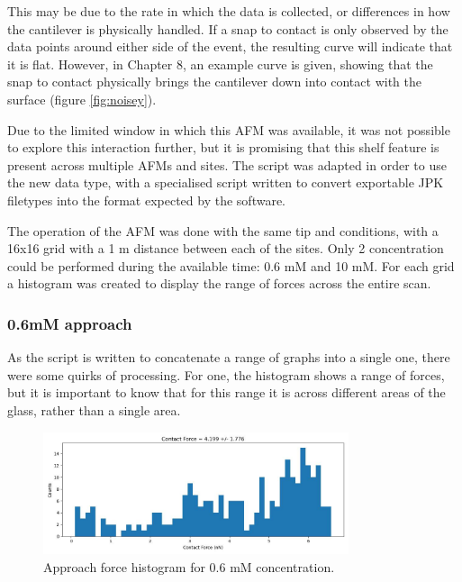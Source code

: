 This may be due to the rate in which the data is collected, or differences in how the cantilever is physically handled. If a snap to contact is only observed by the data points around either side of the event, the resulting curve will indicate that it is flat. However, in Chapter 8, an example curve is given, showing that the snap to contact physically brings the cantilever down into contact with the surface (figure \ref{fig:noisey}). 

Due to the limited window in which this AFM was available, it was not possible to explore this interaction further, but it is promising that this shelf feature is present across multiple AFMs and sites. The script was adapted in order to use the new data type, with a specialised script written to convert exportable JPK filetypes into the format expected by the software.

The operation of the AFM was done with the same tip and conditions, with a 16x16 grid with a 1 \textmu m distance between each of the sites. Only 2 concentration could be performed during the available time: 0.6 mM and 10 mM. For each grid a histogram was created to display the range of forces across the entire scan.

\subsubsection{0.6mM approach}

As the script is written to concatenate a range of graphs into a single one, there were some quirks of processing. For one, the histogram shows a range of forces, but it is important to know that for this range it is across different areas of the glass, rather than a single area.

\begin{figure}[h]
    \centering
    \includegraphics[width=0.8\textwidth]{chapter7/ForceMaps/0.5mM/approach_f_c_hist.jpg}
    \caption{Approach force histogram for 0.6 mM concentration.}
    \label{fig:approach_f_c_hist_0.5mM}
\end{figure}

